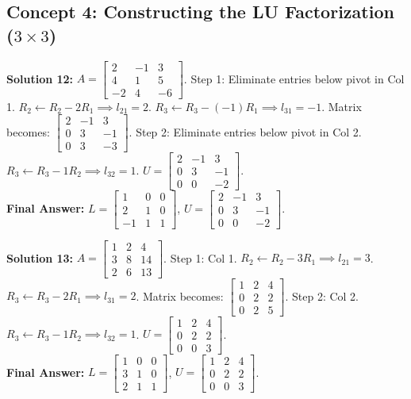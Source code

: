 \documentclass[11pt]{article}
\begin{document}
\subsection*{Concept 4: Constructing the LU Factorization ($3 \times 3$)}

\textbf{Solution 12:}
$A = \begin{bmatrix} 2 & -1 & 3 \\ 4 & 1 & 5 \\ -2 & 4 & -6 \end{bmatrix}$.
Step 1: Eliminate entries below pivot in Col 1.
$R_2 \leftarrow R_2 - 2R_1 \implies l_{21} = 2$.
$R_3 \leftarrow R_3 - (-1)R_1 \implies l_{31} = -1$.
Matrix becomes: $\begin{bmatrix} 2 & -1 & 3 \\ 0 & 3 & -1 \\ 0 & 3 & -3 \end{bmatrix}$.
Step 2: Eliminate entries below pivot in Col 2.
$R_3 \leftarrow R_3 - 1R_2 \implies l_{32} = 1$.
$U = \begin{bmatrix} 2 & -1 & 3 \\ 0 & 3 & -1 \\ 0 & 0 & -2 \end{bmatrix}$. \\
\textbf{Final Answer:} $L = \begin{bmatrix} 1 & 0 & 0 \\ 2 & 1 & 0 \\ -1 & 1 & 1 \end{bmatrix}$, $U = \begin{bmatrix} 2 & -1 & 3 \\ 0 & 3 & -1 \\ 0 & 0 & -2 \end{bmatrix}$.

\vspace{0.5cm}
\textbf{Solution 13:}
$A = \begin{bmatrix} 1 & 2 & 4 \\ 3 & 8 & 14 \\ 2 & 6 & 13 \end{bmatrix}$.
Step 1: Col 1.
$R_2 \leftarrow R_2 - 3R_1 \implies l_{21} = 3$.
$R_3 \leftarrow R_3 - 2R_1 \implies l_{31} = 2$.
Matrix becomes: $\begin{bmatrix} 1 & 2 & 4 \\ 0 & 2 & 2 \\ 0 & 2 & 5 \end{bmatrix}$.
Step 2: Col 2.
$R_3 \leftarrow R_3 - 1R_2 \implies l_{32} = 1$.
$U = \begin{bmatrix} 1 & 2 & 4 \\ 0 & 2 & 2 \\ 0 & 0 & 3 \end{bmatrix}$. \\
\textbf{Final Answer:} $L = \begin{bmatrix} 1 & 0 & 0 \\ 3 & 1 & 0 \\ 2 & 1 & 1 \end{bmatrix}$, $U = \begin{bmatrix} 1 & 2 & 4 \\ 0 & 2 & 2 \\ 0 & 0 & 3 \end{bmatrix}$.
\end{document}
